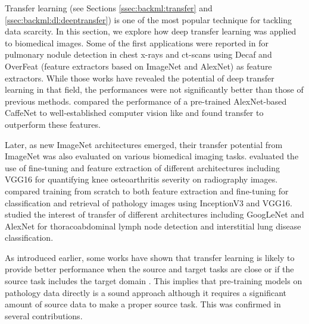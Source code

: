 Transfer learning (see Sections \ref{ssec:backml:transfer} and \ref{ssec:backml:dl:deeptransfer}) is one of the most popular technique for tackling data scarcity. In this section, we explore how deep transfer learning was applied to biomedical images. Some of the first applications were reported in \cite{bar2015chest,ciompi2015automatic,van2015off} for pulmonary nodule detection in chest x-rays and \acrshort{ct}-scans using Decaf and OverFeat (feature extractors based on ImageNet and AlexNet) as feature extractors. While those works have revealed the potential of deep transfer learning in that field, the performances were not significantly better than those of previous methods. \citeauthor{ravishankar2016understanding} \cite{ravishankar2016understanding} compared the performance of a pre-trained AlexNet-based CaffeNet \cite{jia2014caffe} to well-established computer vision like  \cite{mcconnell1986method} and found transfer to outperform these features.

Later, as new ImageNet architectures emerged, their transfer potential from ImageNet was also evaluated on various biomedical imaging tasks. \citeauthor{antony2016quantifying} \cite{antony2016quantifying} evaluated the use of fine-tuning and feature extraction of different architectures including VGG16 for quantifying knee osteoarthritis severity on radiography images. \citeauthor{kieffer2017convolutional} \cite{kieffer2017convolutional} compared training from scratch to both feature extraction and fine-tuning for classification and retrieval of pathology images using InceptionV3 and VGG16. \citeauthor{shin2016deep} \cite{shin2016deep} studied the interest of transfer of different architectures including GoogLeNet and AlexNet for thoracoabdominal lymph node detection and interstitial lung disease classification. 

As introduced earlier, some works have shown that transfer learning is likely to provide better performance when the source and target tasks are close \cite{yosinski2014transferable} or if the source task includes the target domain \cite{mensink2021factors}. This implies that pre-training models on pathology data directly is a sound approach although it requires a significant amount of source data to make a proper source task. This was confirmed in several contributions.

